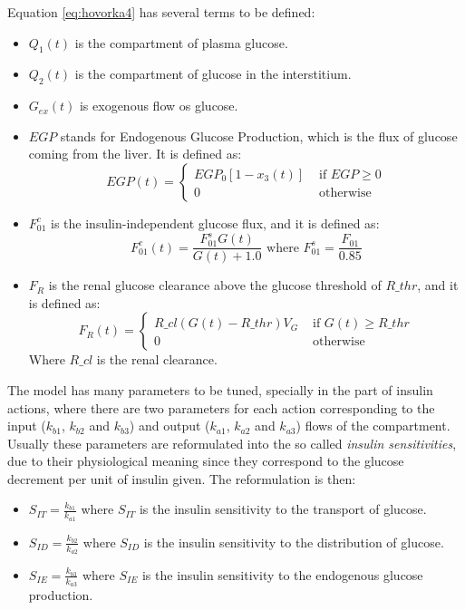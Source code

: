 Equation \eqref{eq:hovorka4} has several terms to be defined:
\begin{itemize}
  \item $Q_1(t)$ is the compartment of plasma glucose.
	\item $Q_2(t)$ is the compartment of glucose in the interstitium.
	\item $G_{ex}(t)$ is exogenous flow os glucose.
	\item \textbf{$EGP$} stands for Endogenous Glucose Production, which is the flux of glucose coming from the liver. It is defined as:
	\begin{equation}
		EGP(t) = \left\{
			\begin{array}{cc} EGP_{0}[1-x_{3}(t)] & \mbox{ if } EGP\geq0 \\
			0 &\mbox{ otherwise } 
			\end{array} \right.
	\label{eq:hovorka7}
	\end{equation}
	\item \textbf{$F_{01}^{c}$} is the insulin-independent glucose flux, and it is defined as:
	\begin{equation}
	  F_{01}^{c}(t)=\frac{F_{01}^{s}G(t)}{G(t)+1.0} \mbox{ where } F_{01}^{s}=\frac{F_{01}}{0.85}
	\label{eq:hovorka8}
	\end{equation}
	\item \textbf{$F_{R}$} is the renal glucose clearance above the glucose threshold of $R\_{thr}$, and it is defined as:
	\begin{equation}
		F_{R}(t)= \left\{
			\begin{array}{cc} R\_{cl}(G(t)-R\_{thr})V_{G} & \mbox{ if } G(t)\geq R\_{thr} \\
			0 &\mbox{ otherwise } 
			\end{array} \right.
	\label{eq:hovorka9}
	\end{equation}
	Where $R\_{cl}$ is the renal clearance.
\end{itemize}
The model has many parameters to be tuned, specially in the part of insulin actions, where there are two parameters for each action corresponding to the input ($k_{b1}$, $k_{b2}$ and $k_{b3}$) and output ($k_{a1}$, $k_{a2}$ and $k_{a3}$) flows of the compartment. Usually these parameters are reformulated into the so called \textit{insulin sensitivities}, due to their physiological meaning since they correspond to the glucose decrement per unit of insulin given. The reformulation is then:
\begin{itemize}
	\item $S_{IT}=\frac{k_{b1}}{k_{a1}}$ where $S_{IT}$ is the insulin sensitivity to the transport of glucose.	
	\item $S_{ID}=\frac{k_{b2}}{k_{a2}}$ where $S_{ID}$ is the insulin sensitivity to the distribution of glucose.
	\item $S_{IE}=\frac{k_{b3}}{k_{a3}}$ where $S_{IE}$ is the insulin sensitivity to the endogenous glucose production.
\end{itemize}
